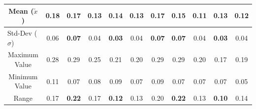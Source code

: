 \begin{itemize}
\begin{table}[htbp]
{\begin{tabular}{@{}ccccccccccc@{}}
      \multicolumn{1}{c|}{Mean ($\tilde{x}$)}                                            & \cellcolor[HTML]{FD6864}\textbf{0.18} & \cellcolor[HTML]{FFFFFF}0.17           & \cellcolor[HTML]{32CB00}\textbf{0.13} & \cellcolor[HTML]{FFFFFF}0.14           & \multicolumn{1}{c|}{\cellcolor[HTML]{32CB00}\textbf{0.13}} & \cellcolor[HTML]{FD6864}\textbf{0.17} & \cellcolor[HTML]{FFFFFF}0.15           & \cellcolor[HTML]{32CB00}\textbf{0.11} & \cellcolor[HTML]{FFFFFF}0.13           & \multicolumn{1}{c|}{\cellcolor[HTML]{FFFFFF}0.12}  \\ \midrule
      \multicolumn{1}{l|}{Std-Dev ($\sigma$)}                                            & \cellcolor[HTML]{FFFFFF}0.06          & \cellcolor[HTML]{FD6864}\textbf{0.07}  & \cellcolor[HTML]{FFFFFF}0.04          & \cellcolor[HTML]{32CB00}\textbf{0.03}  & \multicolumn{1}{c|}{\cellcolor[HTML]{FFFFFF}0.04}          & \cellcolor[HTML]{FD6864}\textbf{0.07} & \cellcolor[HTML]{FD6864}\textbf{0.07}  & \cellcolor[HTML]{FFFFFF}0.04          & \cellcolor[HTML]{32CB00}\textbf{0.03}  & \multicolumn{1}{c|}{\cellcolor[HTML]{FFFFFF}0.04}  \\ \midrule
      \multicolumn{1}{c|}{Maximum Value}                                                 & \cellcolor[HTML]{FFFFFF}0.28          & \cellcolor[HTML]{FFFFFF}0.29           & \cellcolor[HTML]{FFFFFF}0.25          & \cellcolor[HTML]{FFFFFF}0.21           & \multicolumn{1}{c|}{\cellcolor[HTML]{FFFFFF}0.20}          & \cellcolor[HTML]{FFFFFF}0.29          & \cellcolor[HTML]{FFFFFF}0.29           & \cellcolor[HTML]{FFFFFF}0.20          & \cellcolor[HTML]{FFFFFF}0.17           & \multicolumn{1}{c|}{\cellcolor[HTML]{FFFFFF}0.19}  \\ \midrule
      \multicolumn{1}{c|}{Minimum Value}                                                 & \cellcolor[HTML]{FFFFFF}0.11          & \cellcolor[HTML]{FFFFFF}0.07           & \cellcolor[HTML]{FFFFFF}0.08          & \cellcolor[HTML]{FFFFFF}0.09           & \multicolumn{1}{c|}{\cellcolor[HTML]{FFFFFF}0.07}          & \cellcolor[HTML]{FFFFFF}0.09          & \cellcolor[HTML]{FFFFFF}0.07           & \cellcolor[HTML]{FFFFFF}0.07          & \cellcolor[HTML]{FFFFFF}0.07           & \multicolumn{1}{c|}{\cellcolor[HTML]{FFFFFF}0.05}  \\ \midrule
      \multicolumn{1}{c|}{Range}                                                         & \cellcolor[HTML]{FFFFFF}0.17          & \cellcolor[HTML]{FD6864}\textbf{0.22}  & \cellcolor[HTML]{FFFFFF}0.17          & \cellcolor[HTML]{32CB00}\textbf{0.12}  & \multicolumn{1}{c|}{\cellcolor[HTML]{FFFFFF}0.13}          & \cellcolor[HTML]{FFFFFF}0.20          & \cellcolor[HTML]{FD6864}\textbf{0.22}  & \cellcolor[HTML]{FFFFFF}0.13          & \cellcolor[HTML]{32CB00}\textbf{0.10}  & \multicolumn{1}{c|}{\cellcolor[HTML]{FFFFFF}0.14}  \\ \midrule

\end{tabular}}
\end{table}
\end{itemize}
